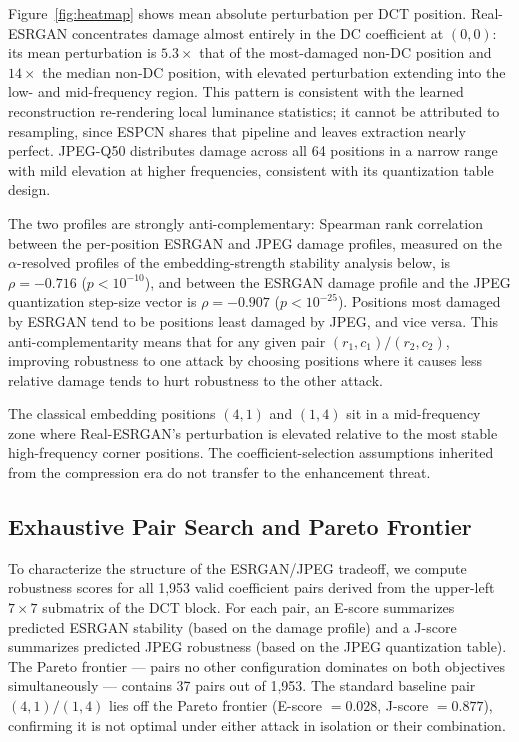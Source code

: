 \documentclass[conference]{IEEEtran}
\begin{document}
Figure~\ref{fig:heatmap} shows mean absolute perturbation per DCT
position. Real-ESRGAN concentrates damage almost entirely in the DC
coefficient at $(0,0)$: its mean perturbation is $5.3\times$ that of the
most-damaged non-DC position and $14\times$ the median non-DC position,
with elevated perturbation extending
into the low- and mid-frequency region. This pattern is consistent with
the learned reconstruction re-rendering local luminance statistics; it
cannot be attributed to resampling, since ESPCN shares that pipeline and
leaves extraction nearly perfect. JPEG-Q50 distributes damage across all
64 positions in a narrow range with mild elevation at higher frequencies,
consistent with its quantization table design.

The two profiles are strongly anti-complementary: Spearman rank
correlation between the per-position ESRGAN and JPEG damage profiles,
measured on the $\alpha$-resolved profiles of the embedding-strength
stability analysis below, is
$\rho = -0.716$ ($p < 10^{-10}$), and between the ESRGAN damage profile
and the JPEG quantization step-size vector is $\rho = -0.907$
($p < 10^{-25}$). Positions most damaged by ESRGAN tend to be positions
least damaged by JPEG, and vice versa. This anti-complementarity means
that for any given pair $(r_1,c_1)/(r_2,c_2)$, improving robustness to
one attack by choosing positions where it causes less relative damage
tends to hurt robustness to the other attack.

The classical embedding positions $(4,1)$ and $(1,4)$ sit in a
mid-frequency zone where Real-ESRGAN's perturbation is elevated relative
to the most stable high-frequency corner positions. The
coefficient-selection assumptions inherited from the compression era do
not transfer to the enhancement threat.

\subsection{Exhaustive Pair Search and Pareto Frontier}

To characterize the structure of the ESRGAN/JPEG tradeoff, we compute
robustness scores for all 1,953 valid coefficient pairs derived from the
upper-left $7\times7$ submatrix of the DCT block. For each pair, an
E-score summarizes predicted ESRGAN stability (based on the damage
profile) and a J-score summarizes predicted JPEG robustness (based on
the JPEG quantization table). The Pareto frontier --- pairs no other
configuration dominates on both objectives simultaneously --- contains
37 pairs out of 1,953. The standard baseline pair $(4,1)/(1,4)$ lies
off the Pareto frontier (E-score $= 0.028$, J-score $= 0.877$),
confirming it is not optimal under either attack in isolation or their
combination.
\end{document}
